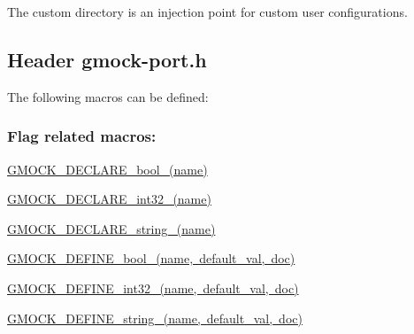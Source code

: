 The custom directory is an injection point for custom user configurations.

\subsection*{Header {\ttfamily gmock-\/port.\+h}}

The following macros can be defined\+:

\subsubsection*{Flag related macros\+:}


\begin{DoxyItemize}
\item {\ttfamily \mbox{\hyperlink{_obj__test_2lib_2googletest-release-1_88_81_2googlemock_2include_2gmock_2internal_2gmock-port_8h_a7a0a953221ea8ef5aaa6c644a48af599}{G\+M\+O\+C\+K\+\_\+\+D\+E\+C\+L\+A\+R\+E\+\_\+bool\+\_\+(name)}}}
\item {\ttfamily \mbox{\hyperlink{_obj__test_2lib_2googletest-release-1_88_81_2googlemock_2include_2gmock_2internal_2gmock-port_8h_adeb7f0a8d842d1d541615763835af3f9}{G\+M\+O\+C\+K\+\_\+\+D\+E\+C\+L\+A\+R\+E\+\_\+int32\+\_\+(name)}}}
\item {\ttfamily \mbox{\hyperlink{_obj__test_2lib_2googletest-release-1_88_81_2googlemock_2include_2gmock_2internal_2gmock-port_8h_a35af08c45131cf68d78446cb8cfe40fe}{G\+M\+O\+C\+K\+\_\+\+D\+E\+C\+L\+A\+R\+E\+\_\+string\+\_\+(name)}}}
\item {\ttfamily \mbox{\hyperlink{_obj__test_2lib_2googletest-release-1_88_81_2googlemock_2include_2gmock_2internal_2gmock-port_8h_a470be328fabbeef3987127adc18a1433}{G\+M\+O\+C\+K\+\_\+\+D\+E\+F\+I\+N\+E\+\_\+bool\+\_\+(name, default\+\_\+val, doc)}}}
\item {\ttfamily \mbox{\hyperlink{_obj__test_2lib_2googletest-release-1_88_81_2googlemock_2include_2gmock_2internal_2gmock-port_8h_a19d91081ff0aaab2f60ef1dc2d6e6b34}{G\+M\+O\+C\+K\+\_\+\+D\+E\+F\+I\+N\+E\+\_\+int32\+\_\+(name, default\+\_\+val, doc)}}}
\item {\ttfamily \mbox{\hyperlink{_obj__test_2lib_2googletest-release-1_88_81_2googlemock_2include_2gmock_2internal_2gmock-port_8h_ad6badbf90e5a813e2bd5668fc6b6a8f7}{G\+M\+O\+C\+K\+\_\+\+D\+E\+F\+I\+N\+E\+\_\+string\+\_\+(name, default\+\_\+val, doc)}}} 
\end{DoxyItemize}